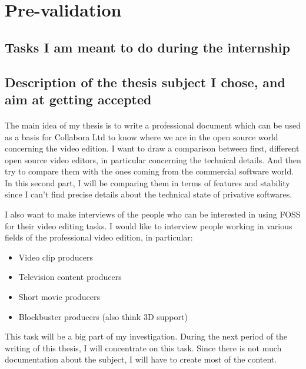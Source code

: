 \newpage
\section{Pre-validation}

\subsection{Tasks I am meant to do during the internship}

    \begin {itemize}
        \item {Implement effects in GStreamer editing Service (GES)\ldots
               Done}
        \item {Merge some branches into the Pitivi video editor\ldots
               Some work done here}
        \item {Work on GStreamer-android, in particular the build system}
        \item {Work on GES implement TimelineObject linking
    \end {itemize}

\subsection{Description of the thesis subject I chose, and aim at getting
            accepted}

  \paragraph{}
      The main idea of my thesis is to write a professional document which can
      be used as a basis for Collabora Ltd to know where we are in the open
      source world concerning the video edition. I want to draw a comparison
      between first, different open source video editors, in particular concerning the
      technical details. And then try to compare them with the ones coming
      from the commercial software world. In this second part, I will be
      comparing them in terms of features and stability since I can't
      find precise details about the technical state of privative softwares.

      I also want to make interviews of the people who can be interested in
      using FOSS for their video editing tasks. I would like to interview
      people working in various fields of the professional video edition,
      in particular:
      \begin{itemize}
        \item {Video clip producers}
        \item {Television content producers}
        \item {Short movie producers}
        \item {Blockbuster producers (also think 3D support)}
      \end{itemize}
      This task will be a big part of my investigation. During the next period
      of the writing of this thesis, I will concentrate on this task. Since
      there is not much documentation about the subject, I will have to create
      most of the content.

